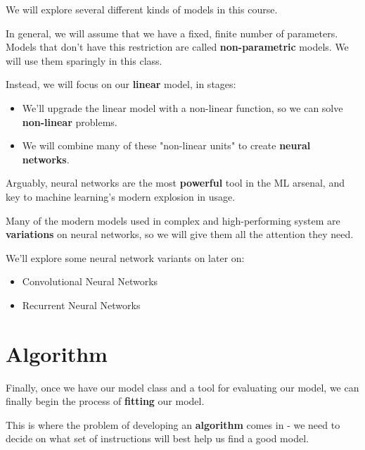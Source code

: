         We will explore several different kinds of models in this course.
        
        In general, we will assume that we have a fixed, finite number of parameters. Models that don't have this restriction are called \textbf{non-parametric} models. We will use them sparingly in this class.
        
        Instead, we will focus on our \textbf{linear} model, in stages:
        
        \begin{itemize}
            \item We'll upgrade the linear model with a non-linear function, so we can solve \textbf{non-linear} problems. 
            
            \item We will combine many of these "non-linear units" to create \textbf{neural networks}.
        \end{itemize}

        Arguably, neural networks are the most \textbf{powerful} tool in the ML arsenal, and key to machine learning's modern explosion in usage.
        
        Many of the modern models used in complex and high-performing system are \textbf{variations} on neural networks, so we will give them all the attention they need.

        We'll explore some neural network variants on later on:

        \begin{itemize}
            \item Convolutional Neural Networks
            \item Recurrent Neural Networks 
        \end{itemize}

\pagebreak

\section{Algorithm}

    Finally, once we have our model class and a tool for evaluating our model, we can finally begin the process of \textbf{fitting} our model.
    
    This is where the problem of developing an \textbf{algorithm} comes in - we need to decide on what set of instructions will best help us find a good model.
    

